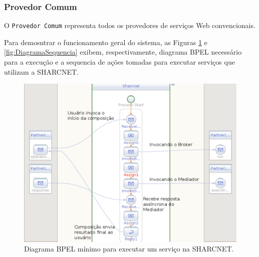 \documentclass[12pt]{report} %
\begin{document}
	\subsubsection{Provedor Comum}
	O \texttt{Provedor Comum} representa todos os provedores de serviços Web convencionais.
	
	Para demosntrar o funcionamento geral do sistema, as Figuras \ref{fig:imagemBPEL} e \ref{fig:DiagramaSequencia} exibem, respectivamente, diagrama BPEL necessário para a execução e a sequencia de ações tomadas para executar serviços que utilizam a SHARCNET.
		
	
	\begin{figure}[!htb]%
	    \begin{center}
		\includegraphics[scale=0.50]{imagens/imagemBPEL.pdf} 
		\caption{Diagrama BPEL mínimo para executar um serviço na SHARCNET.}
		\label{fig:imagemBPEL}
	    \end{center}
	\end{figure}  
	    
\end{document}
